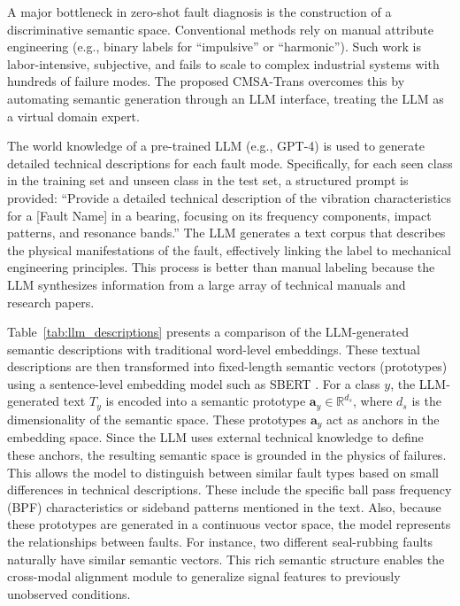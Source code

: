 \documentclass[journal]{IEEEtran}
\begin{document}
A major bottleneck in zero-shot fault diagnosis is the construction of a discriminative semantic space. Conventional methods rely on manual attribute engineering (e.g., binary labels for ``impulsive'' or ``harmonic''). Such work is labor-intensive, subjective, and fails to scale to complex industrial systems with hundreds of failure modes. The proposed CMSA-Trans overcomes this by automating semantic generation through an LLM interface, treating the LLM as a virtual domain expert.

The world knowledge of a pre-trained LLM (e.g., GPT-4) is used to generate detailed technical descriptions for each fault mode. Specifically, for each seen class in the training set and unseen class in the test set, a structured prompt is provided: ``Provide a detailed technical description of the vibration characteristics for a [Fault Name] in a bearing, focusing on its frequency components, impact patterns, and resonance bands.'' The LLM generates a text corpus that describes the physical manifestations of the fault, effectively linking the label to mechanical engineering principles. This process is better than manual labeling because the LLM synthesizes information from a large array of technical manuals and research papers.

Table~\ref{tab:llm_descriptions} presents a comparison of the LLM-generated semantic descriptions with traditional word-level embeddings. These textual descriptions are then transformed into fixed-length semantic vectors (prototypes) using a sentence-level embedding model such as SBERT \cite{reimers2019sentence}. For a class $y$, the LLM-generated text $T_y$ is encoded into a semantic prototype $\mathbf{a}_y \in \mathbb{R}^{d_s}$, where $d_s$ is the dimensionality of the semantic space. These prototypes $\mathbf{a}_y$ act as anchors in the embedding space. Since the LLM uses external technical knowledge to define these anchors, the resulting semantic space is grounded in the physics of failures. This allows the model to distinguish between similar fault types based on small differences in technical descriptions. These include the specific ball pass frequency (BPF) characteristics or sideband patterns mentioned in the text. Also, because these prototypes are generated in a continuous vector space, the model represents the relationships between faults. For instance, two different seal-rubbing faults naturally have similar semantic vectors. This rich semantic structure enables the cross-modal alignment module to generalize signal features to previously unobserved conditions.
\end{document}
